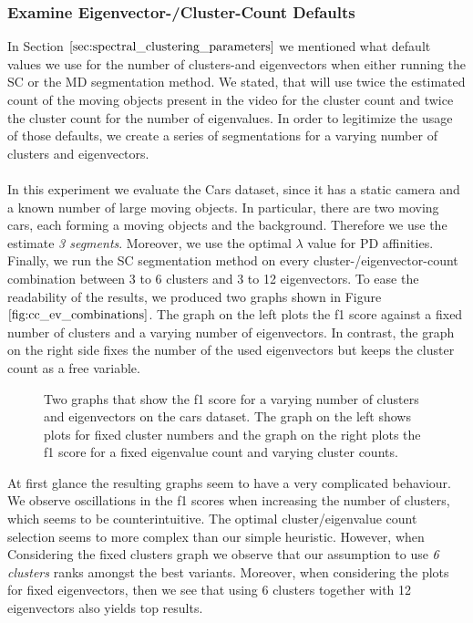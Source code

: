 \subsubsection{Examine Eigenvector-/Cluster-Count Defaults}
In Section $\ref{sec:spectral_clustering_parameters}$ we mentioned what default values we use for the number of clusters-and eigenvectors when either running the SC or the MD segmentation method. We stated, that will use twice the estimated count of the moving objects present in the video for the cluster count and twice the cluster count for the number of eigenvalues. In order to legitimize the usage of those defaults, we create a series of segmentations for a varying number of clusters and eigenvectors. \\ \\
In this experiment we evaluate the Cars dataset, since it has a static camera and a known number of large moving objects. In particular, there are two moving cars, each forming a moving objects and the background. Therefore we use the estimate \textit{3 segments}. Moreover, we use the optimal $\lambda$ value for PD affinities. Finally, we run the SC segmentation method on every cluster-/eigenvector-count combination between 3 to 6 clusters and 3 to 12 eigenvectors. To ease the readability of the results, we produced two graphs shown in Figure $\ref{fig:cc_ev_combinations}$. The graph on the left plots the f1 score against a fixed number of clusters and a varying number of eigenvectors. In contrast, the graph on the right side fixes the number of the used eigenvectors but keeps the cluster count as a free variable.
\begin{figure}[H]
\begin{center}
\end{center}
\caption[Varying number of Clusters / Eigenvectors]{Two graphs that show the f1 score for a varying number of clusters and eigenvectors on the cars dataset. The graph on the left shows plots for fixed cluster numbers and the graph on the right plots the f1 score for a fixed eigenvalue count and varying cluster counts.}
\label{fig:cc_ev_combinations}
\end{figure}
At first glance the resulting graphs seem to have a very complicated behaviour. We observe oscillations in the f1 scores when increasing the number of clusters, which seems to be counterintuitive. The optimal cluster/eigenvalue count selection seems to more complex than our simple heuristic. However, when Considering the fixed clusters graph we observe that our assumption to use \textit{6 clusters} ranks amongst the best variants. Moreover, when considering the plots for fixed eigenvectors, then we see that using 6 clusters together with 12 eigenvectors also yields top results. \\ \\
